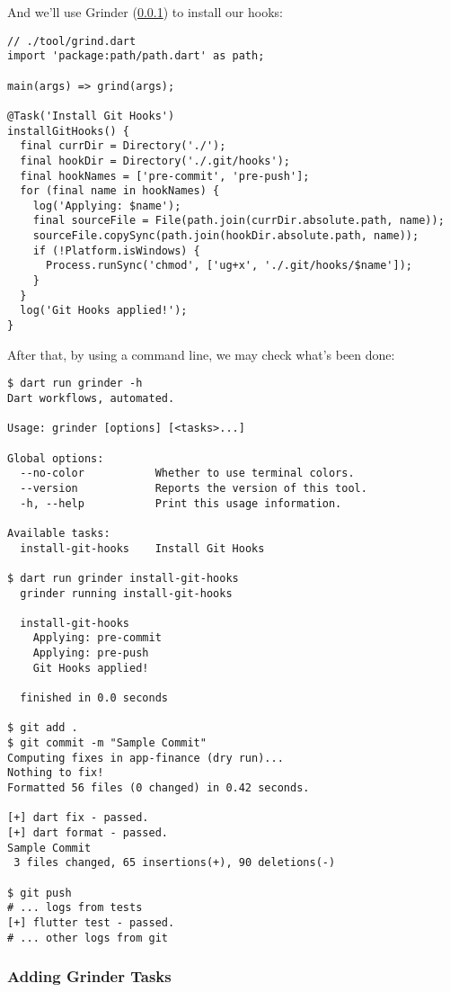 \noindent And we'll use Grinder (\ref{a-grinder}) to install our hooks:

\begin{lstlisting}
// ./tool/grind.dart
import 'package:path/path.dart' as path;

main(args) => grind(args);

@Task('Install Git Hooks')
installGitHooks() {
  final currDir = Directory('./');
  final hookDir = Directory('./.git/hooks');
  final hookNames = ['pre-commit', 'pre-push'];
  for (final name in hookNames) {
    log('Applying: $name');
    final sourceFile = File(path.join(currDir.absolute.path, name));
    sourceFile.copySync(path.join(hookDir.absolute.path, name));
    if (!Platform.isWindows) {
      Process.runSync('chmod', ['ug+x', './.git/hooks/$name']);
    }
  }
  log('Git Hooks applied!');
}
\end{lstlisting}

\noindent After that, by using a command line, we may check what's been done:

\begin{lstlisting}[language=terminal]
$ dart run grinder -h
Dart workflows, automated.

Usage: grinder [options] [<tasks>...]

Global options:
  --no-color           Whether to use terminal colors.
  --version            Reports the version of this tool.
  -h, --help           Print this usage information.

Available tasks:
  install-git-hooks    Install Git Hooks

$ dart run grinder install-git-hooks
  grinder running install-git-hooks

  install-git-hooks
    Applying: pre-commit
    Applying: pre-push
    Git Hooks applied!

  finished in 0.0 seconds

$ git add .
$ git commit -m "Sample Commit"
Computing fixes in app-finance (dry run)...
Nothing to fix!
Formatted 56 files (0 changed) in 0.42 seconds.

[+] dart fix - passed.
[+] dart format - passed.
Sample Commit
 3 files changed, 65 insertions(+), 90 deletions(-)

$ git push
# ... logs from tests
[+] flutter test - passed.
# ... other logs from git
\end{lstlisting}


\subsubsection{Adding Grinder Tasks} \label{a-grinder}

